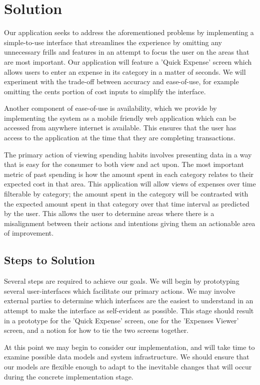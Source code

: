 \documentclass{chi2011}
\begin{document}
\section{Solution}

Our application seeks to address the aforementioned problems by implementing a
simple-to-use interface that streamlines the experience by omitting any
unnecessary frills and features in an attempt to focus the user on the areas
that are most important. Our application will feature a 'Quick Expense' screen
which allows users to enter an expense in its category in a matter of seconds.
We will experiment with the trade-off between accuracy and ease-of-use, for
example omitting the cents portion of cost inputs to simplify the interface.

Another component of ease-of-use is availability, which
we provide by implementing the system as a mobile friendly web application which
can be accessed from anywhere internet is available. This ensures that the user 
has access to the application at the time that they are completing transactions.

The primary action of viewing spending habits involves presenting data in a way
that is easy for the consumer to both view and act upon. The most important
metric of past spending is how the amount spent in each category relates to
their expected cost in that area. This application will allow views of expenses
over time filterable by category; the amount spent in the category will be
contrasted with the expected amount spent in that category over that time
interval as predicted by the user. This allows the user to determine areas where
there is a misalignment between their actions and intentions giving them an
actionable area of improvement.

\subsection{Steps to Solution}

Several steps are required to achieve our goals.  We will begin by prototyping
several user-interfaces which facilitate our primary actions. We may involve
external parties to determine which interfaces are the easiest to understand in
an attempt to make the interface as self-evident as possible. This stage should
result in a prototype for the 'Quick Expense' screen, one for the 'Expenses
Viewer' screen, and a notion for how to tie the two screens together.

At this point we may begin to consider our implementation, and will take time
to examine possible data models and system infrastructure. We should ensure
that our models are flexible enough to adapt to the inevitable changes that will
occur during the concrete implementation stage.
\end{document}
